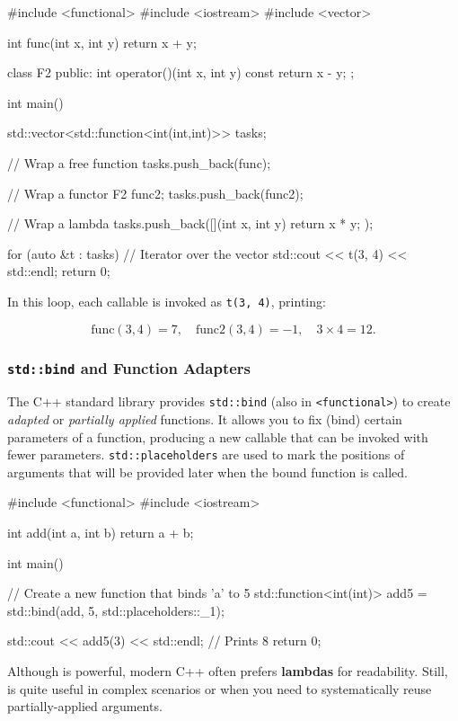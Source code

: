 \begin{codeblock}[language=C++]
#include <functional>
#include <iostream>
#include <vector>

int func(int x, int y) { return x + y; }

class F2 {
public:
    int operator()(int x, int y) const {
        return x - y;
    }
};

int main() {
    std::vector<std::function<int(int,int)>> tasks;

    // Wrap a free function
    tasks.push_back(func);

    // Wrap a functor
    F2 func2;
    tasks.push_back(func2);

    // Wrap a lambda
    tasks.push_back([](int x, int y){ return x * y; });

    for (auto &t : tasks) { // Iterator over the vector
        std::cout << t(3, 4) << std::endl;
    }
    return 0;
}
\end{codeblock}

In this loop, each callable is invoked as \texttt{t(3, 4)}, printing:


$$
   \text{func}(3,4) = 7, \quad \text{func2}(3,4) = -1, \quad 3 \times 4 = 12.
$$

\subsubsection{\texttt{std::bind} and Function Adapters}
The C++ standard library provides \texttt{std::bind} (also in \texttt{<functional>}) to create \textit{adapted} or \textit{partially applied} functions. It allows you to fix (bind) certain parameters of a function, producing a new callable that can be invoked with fewer parameters. \texttt{std::placeholders} are used to mark the positions of arguments that will be provided later when the bound function is called.

\begin{codeblock}[language=C++]
#include <functional>
#include <iostream>

int add(int a, int b) {
    return a + b;
}

int main() {
    // Create a new function that binds 'a' to 5
    std::function<int(int)> add5 = std::bind(add, 5, std::placeholders::_1);

    std::cout << add5(3) << std::endl; // Prints 8
    return 0;
}
\end{codeblock}

\begin{observationblock}
Although  is powerful, modern C++ often prefers \textbf{lambdas} for readability. Still,  is quite useful in complex scenarios or when you need to systematically reuse partially-applied arguments.
\end{observationblock}



